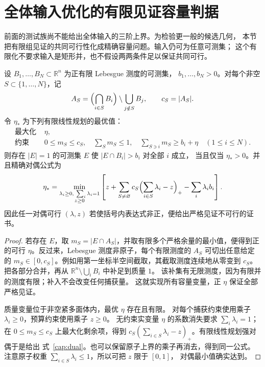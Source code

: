 \section{全体输入优化的有限见证容量判据}\label{cap:section}

前面的测试族尚不能给出全体输入的三阶上界。为检验更一般的候选几何，
本节把有限组见证的共同可行性化成精确容量问题。输入仍可为任意可测集；
这个有限化不要求输入是矩形并，也不假设两两条件足以保证共同可行。

\begin{theorem}[有限见证的严格充要判据]\label{cap:main}
设 $B_1,\ldots,B_N\subset\mathbb R^n$ 为正有限 Lebesgue 测度的可测集，
$b_1,\ldots,b_N>0$。对每个非空 $S\subset\{1,\ldots,N\}$，记
\[
 A_S=\Bigl(\bigcap_{i\in S}B_i\Bigr)\setminus\bigcup_{j\notin S}B_j,
 \qquad c_S=|A_S|.
\]
令 $\eta_*$ 为下列有限线性规划的最优值：
\begin{align*}
 \text{最大化 }&\eta,\\
 \text{约束 }&0\le m_S\le c_S,\quad \sum_Sm_S\le1,\quad
 \sum_{S\ni i}m_S\ge b_i+\eta\quad(1\le i\le N).
\end{align*}
则存在 $|E|=1$ 的可测集 $E$ 使 $|E\cap B_i|>b_i$ 对全部 $i$ 成立，
当且仅当 $\eta_*>0$。并且精确对偶公式为
\begin{equation}\label{cap:dual}
 \eta_*=
 \min_{\substack{\lambda_i\ge0,\ \sum_i\lambda_i=1\\z\ge0}}
 \left[z+\sum_{S\ne\varnothing}c_S
 \Bigl(\sum_{i\in S}\lambda_i-z\Bigr)_+
 -\sum_i\lambda_i b_i\right].
\end{equation}
因此任一对偶可行 $(\lambda,z)$ 若使括号内表达式非正，便给出严格见证不可行的证书。
\end{theorem}
\begin{proof}
若存在 $E$，取 $m_S=|E\cap A_S|$，并取有限多个严格余量的最小值，便得到正的可行
$\eta$。反过来，Lebesgue 测度非原子，每个有限测度的 $A_S$ 可切出任意给定的
$m_S\in[0,c_S]$。例如用第一坐标半空间截取，其截取测度连续地从零变到 $c_S$。
把各部分合并，再从 $\mathbb R^n\setminus\bigcup_iB_i$ 中补足到质量 $1$。
该补集有无限测度，因为有限并的测度有限；补入不会改变任何捕获量。
这就实现所有容量变量，正 $\eta$ 保证全部严格见证。

质量变量位于非空紧多面体内，最优 $\eta$ 存在且有限。
对每个捕获约束使用乘子 $\lambda_i\ge0$，预算约束使用乘子 $z\ge0$。
无约束实变量 $\eta$ 的系数消失要求 $\sum_i\lambda_i=1$；
在 $0\le m_S\le c_S$ 上最大化剩余项，得到
$c_S(\sum_{i\in S}\lambda_i-z)_+$。有限线性规划强对偶于是给出
式~\eqref{cap:dual}。也可以保留原子上界的乘子再消去，得到同一公式。
注意原子权重 $\sum_{i\in S}\lambda_i\le1$，所以可把 $z$ 限于 $[0,1]$，
对偶最小值确实达到。
\end{proof}

